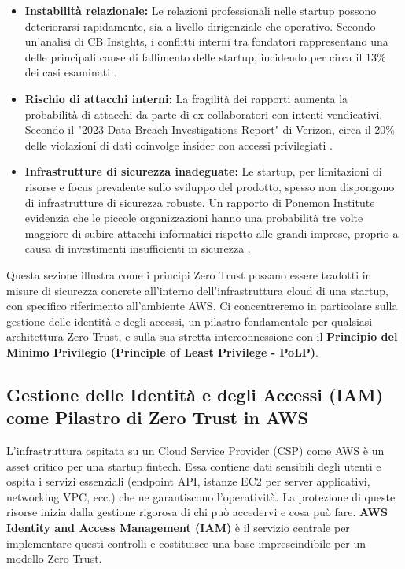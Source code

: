 \documentclass[a4paper,12pt]{report}
\begin{document}
\begin{itemize}
    \item \textbf{Instabilità relazionale:} Le relazioni professionali nelle startup possono deteriorarsi rapidamente, sia a livello dirigenziale che operativo. Secondo un'analisi di CB Insights, i conflitti interni tra fondatori rappresentano una delle principali cause di fallimento delle startup, incidendo per circa il 13\% dei casi esaminati \cite{CBInsights2023}. 
    \item \textbf{Rischio di attacchi interni:} La fragilità dei rapporti aumenta la probabilità di attacchi da parte di ex-collaboratori con intenti vendicativi. Secondo il "2023 Data Breach Investigations Report" di Verizon, circa il 20\% delle violazioni di dati coinvolge insider con accessi privilegiati \cite{Verizon2023}.
    \item \textbf{Infrastrutture di sicurezza inadeguate:} Le startup, per limitazioni di risorse e focus prevalente sullo sviluppo del prodotto, spesso non dispongono di infrastrutture di sicurezza robuste. Un rapporto di Ponemon Institute evidenzia che le piccole organizzazioni hanno una probabilità tre volte maggiore di subire attacchi informatici rispetto alle grandi imprese, proprio a causa di investimenti insufficienti in sicurezza \cite{Ponemon2023}.
\end{itemize}
Questa sezione illustra come i principi Zero Trust possano essere tradotti in misure di sicurezza concrete all'interno dell'infrastruttura cloud di una startup, con specifico riferimento all'ambiente AWS. Ci concentreremo in particolare sulla gestione delle identità e degli accessi, un pilastro fondamentale per qualsiasi architettura Zero Trust, e sulla sua stretta interconnessione con il \textbf{Principio del Minimo Privilegio (Principle of Least Privilege - PoLP)}.

\subsection{Gestione delle Identità e degli Accessi (IAM) come Pilastro di Zero Trust in AWS}
\label{subsec:iam-zero-trust}

L'infrastruttura ospitata su un Cloud Service Provider (CSP) come AWS è un asset critico per una startup fintech. Essa contiene dati sensibili degli utenti e ospita i servizi essenziali (endpoint API, istanze EC2 per server applicativi, networking VPC, ecc.) che ne garantiscono l'operatività. La protezione di queste risorse inizia dalla gestione rigorosa di chi può accedervi e cosa può fare. \textbf{AWS Identity and Access Management (IAM)} è il servizio centrale per implementare questi controlli e costituisce una base imprescindibile per un modello Zero Trust.
\end{document}
